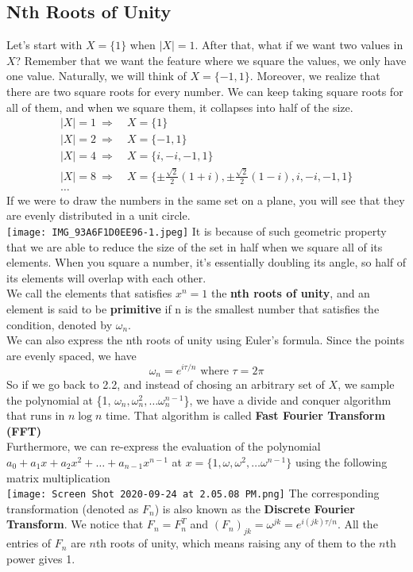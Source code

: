 \documentclass[a4paper]{article}
\renewcommand{\sb}{\vspace*{4px} \\}
\begin{document}
\subsection{Nth Roots of Unity}
Let's start with $X = \{1\}$ when $|X|=1$. After that, what if we want two values in $X$? 
Remember that we want the feature where we square the 
values, we only have one value. Naturally, we will think of $X = \{-1, 1\}$. 
Moreover, we realize that there are two square roots for every number. 
We can keep taking square roots for all of them, and when we square them, it collapses into half of the size.
\begin{align*}
    |X|=1 \ \Rightarrow \ &X=\{1\} \\
    |X|=2 \ \Rightarrow \ &X=\{-1, 1\} \\
    |X|=4 \ \Rightarrow \ &X=\{i, -i, -1, 1\} \\
    |X|=8 \ \Rightarrow \ &X=\{\pm \frac{\sqrt{2}}{2}(1+i), \pm \frac{\sqrt{2}}{2}(1-i) , i, -i, -1, 1\} \\
    \dots
\end{align*}
If we were to draw the numbers in the same set on a plane, you will see that they are evenly distributed in a unit circle. \\
\texttt{[image: IMG\_93A6F1D0EE96-1.jpeg]}
It is because of such geometric property that we are able to reduce the size of the set in half when we square all of its elements. When you 
square a number, it's essentially doubling its angle, so half of its elements will overlap with each other. \sb
We call the elements that satisfies $x^n = 1$ the \textbf{nth roots of unity}, and an element is said to be \textbf{primitive} if n is 
the smallest number that satisfies the condition, denoted by $\omega_n$.\sb
We can also express the nth roots of unity using Euler's formula. Since the points are evenly spaced, we have
\[ \omega_n = e^{i\tau / n} \text{  where  } \tau = 2\pi \]
So if we go back to 2.2, and instead of chosing an arbitrary set of $X$, we sample the 
polynomial at \{1, $\omega_n, \omega_n^2, \dots \omega_n^{n-1}$\}, we have a divide and conquer algorithm that 
runs in $n \log n$ time. That algorithm is called \textbf{Fast Fourier Transform (FFT)} \sb
Furthermore, we can re-express the evaluation of the polynomial $a_0 + a_1x + a_2x^2 + \dots + a_{n-1}x^{n-1}$ at 
$x = \{1, \omega, \omega^2, \dots \omega^{n-1}\}$ using the following matrix multiplication \sb
\texttt{[image: Screen Shot 2020-09-24 at 2.05.08 PM.png]}
The corresponding transformation (denoted as $F_n$) is also known as the \textbf{Discrete Fourier Transform}. We notice that $F_n = F_n^T$ and 
$(F_n)_{jk} = \omega^{jk} = e^{i(jk)\tau/n}$. All the entries of $F_n$ are $n$th roots of unity, 
which means raising any of them to the $n$th power gives 1. 
\end{document}
